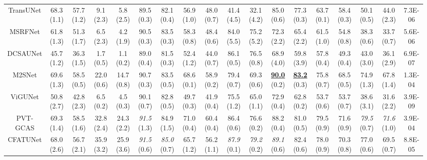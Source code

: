 \begin{table*}[t]
\begin{tabular}{c|cc|cc|cc|cc|cc|cc|cc|cc|c}
     TransUNet \cite{chen2021transunet}       & 68.3 \tiny{(1.1)} & 57.7 \tiny{(1.2)} & 9.1 \tiny{(2.3)} & 5.8 \tiny{(2.5)} & 89.5 \tiny{(0.3)} & 82.1 \tiny{(0.4)} & 56.9 \tiny{(1.0)} & 48.0 \tiny{(0.7)} & 41.4 \tiny{(4.5)} & 32.1 \tiny{(4.2)} & 85.0 \tiny{(0.6)} & 77.3 \tiny{(0.3)} & 63.7 \tiny{(0.1)} & 58.4 \tiny{(0.3)} & 50.1 \tiny{(0.5)} & 44.0 \tiny{(2.3)} & 7.3E-06 \\
     MSRFNet \cite{srivastava2021msrf}        & 61.8 \tiny{(1.3)} & 51.3 \tiny{(1.7)} & 6.5 \tiny{(2.3)} & 4.2 \tiny{(1.9)} & 90.5 \tiny{(0.3)} & 83.5 \tiny{(0.3)} & 58.3 \tiny{(0.8)} & 48.4 \tiny{(0.6)} & 84.0 \tiny{(5.5)} & 75.2 \tiny{(5.2)} & 72.3 \tiny{(2.2)} & 65.4 \tiny{(2.2)} & 61.5 \tiny{(1.0)} & 54.8 \tiny{(0.8)} & 38.3 \tiny{(0.6)} & 33.7 \tiny{(0.7)} & 5.6E-06 \\
     DCSAUNet \cite{xu2023dcsau}              & 45.7 \tiny{(1.2)} & 36.3 \tiny{(1.5)} & 1.7 \tiny{(0.5)} & 1.1 \tiny{(0.2)} & 89.0 \tiny{(0.4)} & 81.5 \tiny{(0.3)} & 52.4 \tiny{(1.2)} & 44.0 \tiny{(0.7)} & 86.1 \tiny{(0.5)} & 76.5 \tiny{(0.8)} & 68.9 \tiny{(4.0)} & 59.8 \tiny{(3.9)} & 57.8 \tiny{(0.4)} & 49.3 \tiny{(0.4)} & 43.0 \tiny{(3.0)} & 36.1 \tiny{(2.9)} & 6.9E-07  \\
     M2SNet \cite{zhao2023m}                  & 69.6 \tiny{(1.3)} & 58.5 \tiny{(0.5)} & 22.0 \tiny{(0.6)} & 14.7 \tiny{(0.8)} & 90.7 \tiny{(0.3)} & 83.5 \tiny{(0.5)} & 68.6 \tiny{(0.1)} & 58.9 \tiny{(0.2)} & 79.4 \tiny{(0.7)} & 69.3 \tiny{(0.6)} & \textbf{\underline{90.0}} \tiny{(0.2)} & \textbf{\underline{83.2}} \tiny{(0.3)} & 75.8 \tiny{(0.7)} & 68.5 \tiny{(0.5)} & 74.9 \tiny{(1.3)} & 67.8 \tiny{(1.4)} & 1.3E-04 \\
     ViGUNet \cite{jiang2023vig}              & 50.8 \tiny{(2.7)} & 42.8 \tiny{(2.3)} & 6.5 \tiny{(0.2)} & 4.5 \tiny{(0.3)} & 90.1 \tiny{(0.7)} & 82.8 \tiny{(0.5)} & 49.7 \tiny{(0.3)} & 41.9 \tiny{(0.4)} & 75.5 \tiny{(1.2)} & 65.0 \tiny{(1.1)} & 72.9 \tiny{(0.4)} & 62.8 \tiny{(0.2)} & 53.7 \tiny{(0.6)} & 53.7 \tiny{(0.7)} & 38.6 \tiny{(3.1)} & 31.6 \tiny{(2.2)} & 3.9E-09 \\
     PVT-GCAS \cite{rahman2024g}          & 69.3 \tiny{(1.4)} & 58.5 \tiny{(1.6)} & 32.8 \tiny{(2.4)}  & 24.3 \tiny{(2.2)} & \textit{91.5} \tiny{(1.3)} & 84.9 \tiny{(1.5)} & 71.0 \tiny{(0.4)} & 60.4 \tiny{(0.4)} & 86.4 \tiny{(0.6)} & 76.6 \tiny{(0.2)} & 88.2 \tiny{(0.4)} & 81.0 \tiny{(0.5)} & 79.5 \tiny{(0.9)} & 71.6 \tiny{(0.9)} & \textit{79.5} \tiny{(0.7)} & \textit{71.6} \tiny{(1.0)} & 3.9E-04 \\
     CFATUNet \cite{wang2024cfatransunet} & 68.0 \tiny{(2.6)} & 56.7 \tiny{(2.1)} & 35.9 \tiny{(3.2)} & 25.9 \tiny{(3.6)} & \textit{91.5} \tiny{(0.6)} & \textit{85.0} \tiny{(0.7)} & 65.7 \tiny{(1.2)} & 56.2 \tiny{(1.1)} & \textit{87.9} \tiny{(0.1)} & \textit{79.2} \tiny{(0.2)} & \textit{89.1} \tiny{(0.6)} & 82.4 \tiny{(0.6)} & 78.0 \tiny{(0.9)} & 70.3 \tiny{(0.8)} & 77.0 \tiny{(0.6)} & 69.5 \tiny{(0.7)} & 8.8E-05 \\

\end{tabular}
\end{table*}
